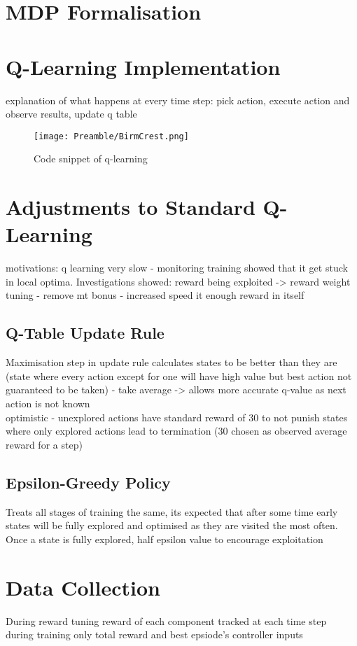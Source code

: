 \section{MDP Formalisation}

\section{Q-Learning Implementation}
explanation of what happens at every time step: pick action, execute action and observe results, update q table
\begin{figure}
    \centering
    \texttt{[image: Preamble/BirmCrest.png]}
    \caption{Code snippet of q-learning}
    \label{fig:q-code-snip}
\end{figure}

\section{Adjustments to Standard Q-Learning}
motivations: q learning very slow - monitoring training showed that it get stuck in local optima. Investigations showed: reward being exploited -> reward weight tuning - remove mt bonus - increased speed it enough reward in itself
\subsection{Q-Table Update Rule}
Maximisation step in update rule calculates states to be better than they are (state where every action except for one will have high value but best action not guaranteed to be taken) - take average -> allows more accurate q-value as next action is not known
\\ optimistic - unexplored actions have standard reward of 30 to not punish states where only explored actions lead to termination (30 chosen as observed average reward for a step)

\subsection{Epsilon-Greedy Policy}
Treats all stages of training the same, its expected that after some time early states will be fully explored and optimised as they are visited the most often. Once a state is fully explored, half epsilon value to encourage exploitation

\section{Data Collection}
During reward tuning reward of each component tracked at each time step
\\ during training only total reward and best epsiode's controller inputs
